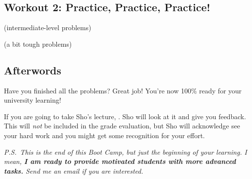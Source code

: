 \documentclass[11pt,pdfa,lastpage]{MishoNote}
\begin{document}
\subsection{Workout 2: Practice, Practice, Practice!}
\begin{enumerate}[resume]
\itemA \textsf{(intermediate-level problems)}
\begin{menumerate}{3}


\end{menumerate}
\newpage
\itemB \textsf{(a bit tough problems)}
\begin{menumerate}{3}


\end{menumerate}
\end{enumerate}

\vfill
\subsection*{Afterwords}

Have you finished all the problems? Great job! You're now 100\% ready for your university learning!

If you are going to take Sho's lecture, .
Sho will look at it and give you feedback. This will \emph{not} be included in the grade evaluation, but Sho will acknowledge see your hard work and you might get some recognition for your effort.


\vfill

\noindent
\emph{P.S.~This is the end of this Boot Camp, but just the beginning of your learning. I mean, \textbf{I am ready to provide motivated students with more advanced tasks.} Send me an email if you are interested.}
\end{document}
